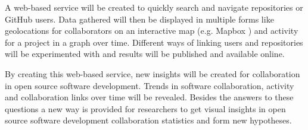 \documentclass[acmtog, authorversion]{acmart}
\begin{document}
A web-based service will be created to quickly search and navigate repositories or GitHub users.
Data gathered will then be displayed in multiple forms like geolocations for collaborators on an interactive map (e.g. Mapbox \cite{MapBox}) and activity for a project in a graph over time.
Different ways of linking users and repositories will be experimented with and results will be published and available online.

By creating this web-based service, new insights will be created for collaboration in open source software development.
Trends in software collaboration, activity and collaboration links over time will be revealed.
Besides the answers to these questions a new way is provided for researchers to get visual insights in open source software development collaboration statistics and form new hypotheses.



\end{document}
